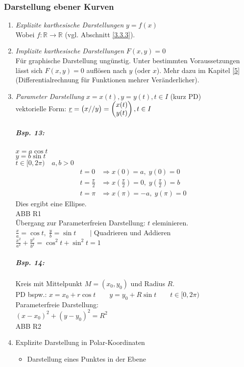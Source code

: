 \subsubsection{Darstellung ebener Kurven}
\begin{enumerate}
\item \emph{Explizite karthesische Darstellungen} $y=f(x)$\\
Wobei $f: \mathbb{R}\to \mathbb{R}$ (vgl. Abschnitt \ref{3.3.3}).
\item \emph{Implizite karthesische Darstellungen} $F(x,y)=0$\\
Für graphische Darstellung ungünstig. Unter bestimmten Voraussetzungen lässt sich $F(x,y)=0$ auflösen nach $y$ (oder $x$). Mehr dazu im Kapitel \ref{5} (Differentialrechnung für Funktionen mehrer Veränderlicher).
\item \emph{Parameter Darstellung} $x=x(t), y=y(t), t\in I$ (kurz PD)\\
vektorielle Form: $\underline{r}=\begin{pmatrix}x//y\end{pmatrix}=\begin{pmatrix}x(t)\\y(t)\end{pmatrix}, t \in I$
\subparagraph{Bsp. 13:}\parskp
$x=a \cos t$\\
$y=b \sin t$\\
$t\in [0,2\pi) \quad a,b>0$
\begin{align*}
t=0 &\Rightarrow x(0)=a, \; y(0)=0\\
t=\frac{\pi}{2} &\Rightarrow x\left(\frac{\pi}{2}\right)=0, \; y\left(\frac{\pi}{2}\right)=b\\
t=\pi &\Rightarrow x\left(\pi\right)=-a,\; y(\pi)=0
\end{align*}
Dies ergibt eine Ellipse.\\
ABB R1\\
Übergang zur Parameterfreien Darstellung: $t$ eleminieren.\\
$\frac{x}{a}=\cos t, \; \frac{y}{b}=\sin t \qquad|$ Quadrieren und Addieren\\
$\boxed{\frac{x^2}{a^2}+\frac{y^2}{b^2}=\cos^2t+\sin^2t=1}$
\subparagraph{Bsp. 14:} Kreis mit Mittelpunkt $M=(x_0, y_0) $ und Radius $R$.\\
PD bspw.: $x=x_0+r\cos t \qquad y=y_0+R \sin t \qquad t \in [0,2\pi)$\\
Parameterfreie Darstellung: \\
$(x-x_0)^2+(y-y_0)^2=R^2$\\
ABB R2
\item Explizite Darstellung in Polar-Koordinaten
\begin{itemize}
\item Darstellung eines Punktes in der Ebene\\

\end{itemize}
\end{enumerate}
